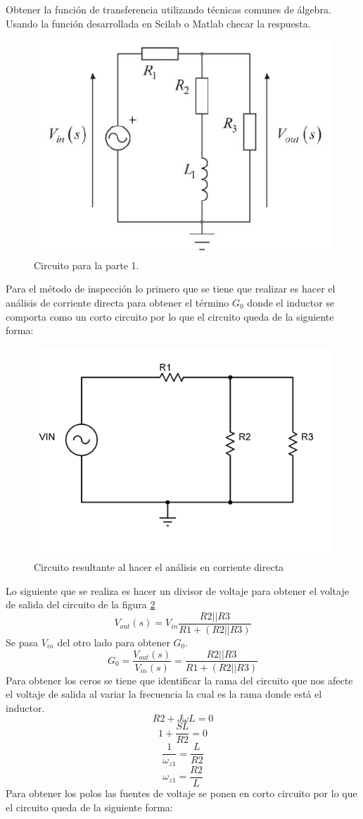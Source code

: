 \documentclass[letterpaper,10pt]{article}
\begin{document}
	\textbullet Obtener la función de transferencia utilizando técnicas comunes de álgebra.\\
	
	\textbullet Usando la función desarrollada en Scilab o Matlab checar la respuesta.
	\begin{figure}[h!]
		\centering
		\includegraphics[width=0.5\linewidth]{circuito_1}
		\caption{Circuito para la parte 1.}
		\label{fig:circuito1}
	\end{figure}
\FloatBarrier
Para el método de inspección lo primero que se tiene que realizar es hacer el análisis de corriente directa para obtener el término $G_{0}$ donde el inductor se comporta como un corto circuito por lo que el circuito queda de la siguiente forma:
\begin{figure}[h!]
	\centering
	\includegraphics[width=0.5\linewidth]{esque_1}
	\caption{Circuito resultante al hacer el análisis en corriente directa}
	\label{fig:esque1}
\end{figure}
\FloatBarrier
Lo siguiente que se realiza es hacer un divisor de voltaje para obtener el voltaje de salida del circuito de la figura \ref{fig:esque1} 
\[V_{out}(s)=V_{in}\frac{R2||R3}{R1+(R2||R3)}\]
Se pasa $V_{in}$ del otro lado para obtener $G_{0}$.
\[G_{0}=\frac{V_{out}(s)}{V_{in}(s)}=\frac{R2||R3}{R1+(R2||R3)}\]
Para obtener los ceros se tiene que identificar la rama del circuito que nos afecte el voltaje de salida al variar la frecuencia la cual es la rama donde está el inductor.
\[R2+J\omega L=0\]
\[1+\frac{SL}{R2}=0\]
\[\frac{1}{\omega_{z1}}=\frac{L}{R2}\]
\[\omega_{z1}=\frac{R2}{L}\]
Para obtener los polos las fuentes de voltaje se ponen en corto circuito por lo que el circuito queda de la siguiente forma:
\end{document}
